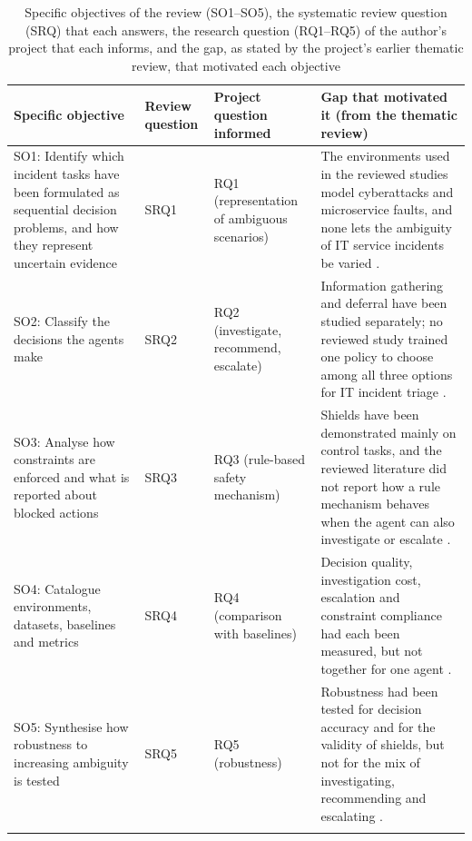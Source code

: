 \documentclass[pdflatex,sn-basic]{sn-jnl}
\begin{document}
\begin{table}[!htbp]
\caption{Specific objectives of the review (SO1--SO5), the systematic review question (SRQ) that each answers, the research question (RQ1--RQ5) of the author's project that each informs, and the gap, as stated by the project's earlier thematic review, that motivated each objective}\label{tab:objectives}
\footnotesize
\begin{tabularx}{\textwidth}{@{}P{2.9cm}P{1.0cm}P{2.1cm}L@{}}
\toprule
Specific objective & Review question & Project question informed & Gap that motivated it (from the thematic review) \\
\midrule
SO1: Identify which incident tasks have been formulated as sequential decision problems, and how they represent uncertain evidence & SRQ1 & RQ1 (representation of ambiguous scenarios) & The environments used in the reviewed studies model cyberattacks and microservice faults, and none lets the ambiguity of IT service incidents be varied \citep{hammar2025,dunsin2025,wang2023hrlhf}. \\
SO2: Classify the decisions the agents make & SRQ2 & RQ2 (investigate, recommend, escalate) & Information gathering and deferral have been studied separately; no reviewed study trained one policy to choose among all three options for IT incident triage \citep{janisch2019,kim2025,madras2018,joshi2023}. \\
SO3: Analyse how constraints are enforced and what is reported about blocked actions & SRQ3 & RQ3 (rule-based safety mechanism) & Shields have been demonstrated mainly on control tasks, and the reviewed literature did not report how a rule mechanism behaves when the agent can also investigate or escalate \citep{alshiekh2018,konighofer2025,alauthman2026}. \\
SO4: Catalogue environments, datasets, baselines and metrics & SRQ4 & RQ4 (comparison with baselines) & Decision quality, investigation cost, escalation and constraint compliance had each been measured, but not together for one agent \citep{remil2024,levy2026,pacella2026}. \\
SO5: Synthesise how robustness to increasing ambiguity is tested & SRQ5 & RQ5 (robustness) & Robustness had been tested for decision accuracy and for the validity of shields, but not for the mix of investigating, recommending and escalating \citep{kim2025,hammar2025,hamel2026}. \\
\botrule
\end{tabularx}
\end{table}
\end{document}
